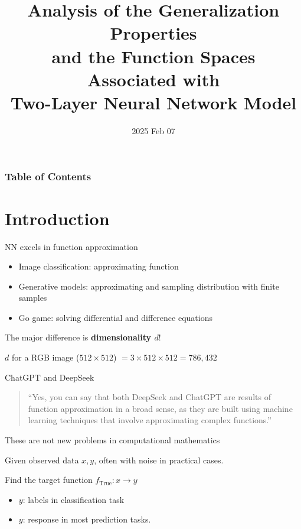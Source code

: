 \documentclass[aspectratio=32]{beamer}
\title[]
{
    Analysis of the Generalization Properties \\
    and the Function Spaces Associated with \\
    Two-Layer Neural Network Model
}
\author[Yongqi Wang]{
    Yongqi Wang, Master Thesis\\
    {\and} \\
    {Adviser: Prof. Dr. Sara van de Geer}
}
\date{2025 Feb 07}
\begin{document}


\frame{\titlepage}

\begin{frame}[allowframebreaks]
    \frametitle{Table of Contents}
    \tableofcontents[
        currentsection,
        sectionstyle=show/show,
        subsectionstyle=show/show/hide
    ]
\end{frame}

\section{Introduction}

\begin{frame}{NN excels in function approximation}
    \begin{itemize}
        \item Image classification: approximating function
        \item Generative models: approximating and sampling distribution with finite samples
        \item Go game: solving differential and difference equations
    \end{itemize}

    \begin{center}
        The major difference is \textbf{dimensionality $d$}!
    \end{center}

    $d$ for a RGB image ($512 \times 512$) $= 3 \times 512 \times 512 = 786,432$

    \begin{exampleblock}{ChatGPT and DeepSeek}
    \begin{quotation}
        ``Yes, you can say that both DeepSeek and ChatGPT are results of function approximation in a broad sense, as they are built using machine learning techniques that involve approximating complex functions.''        
    \end{quotation}
    \end{exampleblock}
    
\end{frame}

\begin{frame}{These are not new problems in computational mathematics}

    Given observed data $x, y$, often with noise in practical cases.

    Find the target function $f_{\text{True}}: x \to y$

    \begin{itemize}
        \item $y$: labels in classification task
        \item $y$: response in most prediction tasks.
    \end{itemize}

    \vspace{0.1\pdfpageheight}


\end{frame}
\end{document}
